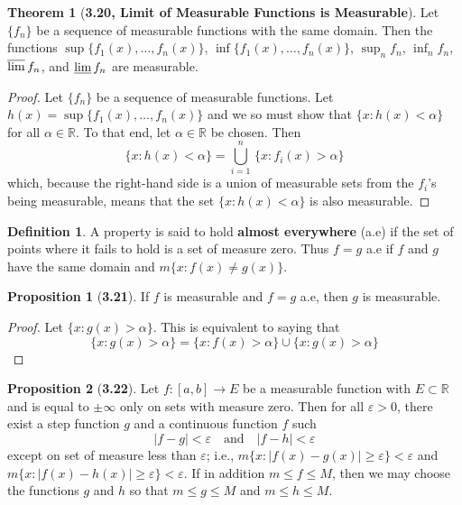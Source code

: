 \documentclass[12pt]{article}
\newcommand{\R}{\mathbb{R}}
\renewcommand{\epsilon}{\varepsilon}
\theoremstyle{definition}
\newtheorem*{thm}{Theorem}
\newtheorem*{definition}{Definition}
\newtheorem*{prop}{Proposition}
\begin{document}
\begin{thm}[\textbf{3.20, Limit of Measurable Functions is Measurable}]

    Let \( \{ f_n \} \) be a sequence of measurable functions with the same domain. Then the functions \( \sup\{f_1(x), \ldots, f_n(x) \} \), \( \inf \{ f_1(x), \ldots, f_n(x)\}\), \( \sup_{n} f_n \), \( \inf_{n} f_n \), \( \varlimsup f_n \), and \( \varliminf f_n \) are measurable. 

        \begin{proof}
            Let \( \{ f_n\} \) be a sequence of measurable functions. Let \( h(x) = \sup\{f_1(x), \ldots, f_n(x) \} \) and we so must show that \( \{ x: h(x) < \alpha \}\) for all \( \alpha \in \R \). To that end, let \( \alpha \in \R \) be chosen. Then 
                \[
                     \{ x: h(x) < \alpha \} = \bigcup_{i=1}^{n} \, \{ x: f_i(x) > \alpha \}
                \]
            which, because the right-hand side is a union of measurable sets from the \( f_i \)'s being measurable, means that the set \( \{ x: h(x) < \alpha \}\)  is also measurable. 
        \end{proof}


\end{thm}

\begin{definition}
    A property is said to hold \textbf{almost everywhere} (a.e) if the set of points where it fails to hold is a set of measure zero. Thus \(f = g\) a.e if \( f \) and \( g \) have the same domain and \( m \{ x: f(x) \neq g(x) \} \). 
\end{definition}

\begin{prop}[\textbf{3.21}]

    If \( f \) is measurable and \( f =  g\) a.e, then \( g \) is measurable.

        \begin{proof}
            Let \( \{ x: g(x) > \alpha \} \). This is equivalent to saying that     
                \[
                    \{ x: g(x) > \alpha \} = \{ x: f(x) > \alpha \} \cup \{ x: g(x) > \alpha \}
                \]
        \end{proof}
    
\end{prop}

\begin{prop}[\textbf{3.22}]

    Let \( f: [a,b] \to E \) be a measurable function with \( E \subset \R \) and is equal to \( \pm \infty \) only on sets with measure zero. Then for all \( \epsilon > 0 \), there exist a step function \( g \) and a continuous function \( f \) such 
        \[
            |f - g| < \epsilon \quad \text{and} \quad |f - h| < \epsilon  
        \]
    except on set of measure less than \( \epsilon \); i.e., \( m\{x: |f(x) - g(x)| \geq \epsilon\} <  \epsilon \) and \( m\{x: |f(x) - h(x)| \geq \epsilon\} <  \epsilon \). If in addition \( m \leq f \leq M \), then we may choose the functions \( g \) and \( h \) so that \( m \leq g \leq M\) and \( m \leq h \leq M \).
 
\end{prop}
\end{document}
